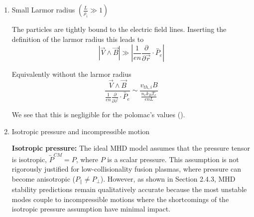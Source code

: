 \begin{enumerate}
We get for Polomac (\cite{Elio2024}):
\begin{itemize}
    \item Mass density: $ \varrho = n m_i = \SI{e20}{\per\meter\cubed} \times \SI{1.67e-27}{\kilo\gram} = \SI{1.67e-7}{\kilo\gram\per\meter\cubed}$
    \item Magnetic field: $B = \SI{0.25}{\tesla}$ (midpoint of \SIrange{0.2}{0.3}{\tesla} operating range)
    \item Alfvén velocity: $v_A = \frac{\SI{0.25}{\tesla}}{\sqrt{4\pi \times \SI{e-7}{\henry\per\meter} \times \SI{1.67e-7}{\kilo\gram\per\meter\cubed}}} = \SI{5.5e4}{\meter\per\second}$
    \item Speed of light: $c = \SI{3e8}{\meter\per\second}$
    \item $\frac{v_A}{c} = \frac{\SI{5.5e4}{\meter\per\second}}{\SI{3e8}{\meter\per\second}} \approx \num{1.8e-4} \ll 1$
\end{itemize}

Since MHD wave velocities are non-relativistic ($v_A \ll c$), we can safely neglect the displacement current $\epsilon_0 \partial \vec{E}/\partial t$ compared to $\vec{J}$ in Ampère's law.

Note that $\mu_0 \vec{J} = \nabla \wedge \vec{B}$ implies $\nabla \cdot \vec{J} = 0$.


\item Small Larmor radius $\left(\frac{L}{\rho_i} \gg 1\right)$

The particles are tightly bound to the electric field lines. Inserting the definition of the larmor radius this leads to
\[
\left|\vec{V} \wedge \vec{B}\right| \gg \left|\frac{1}{en} \frac{\partial}{\partial \vec{r}} \cdot \overleftrightarrow{P_e}\right|
\]

Equivalently without the larmor radius
\[
\frac{\vec{V}\wedge\vec{B}}{\frac{1}{en} \frac{\partial}{\partial \vec{r}} \cdot \overleftrightarrow{P_e}}
\sim \frac{v_{th, i} B}{\frac{n_e k_B T_e}{e n L}}
\]

We see that this is negligible for the polomac's values (\cite{Elio2024}).



\item Isotropic pressure and incompressible motion

    \textbf{Isotropic pressure:} The ideal MHD model assumes that the pressure tensor is isotropic, 
    $\overleftrightarrow{P}^{CM} = P$, where $P$ is a scalar pressure. This assumption 
    is not rigorously justified for low-collisionality fusion plasmas, where pressure can become 
    anisotropic ($P_\parallel \neq P_\perp$). However, as shown in \cite{Freidberg2014} Section 2.4.3, 
    MHD stability predictions remain qualitatively accurate because the most unstable modes couple 
    to incompressible motions where the shortcomings of the isotropic pressure assumption have 
    minimal impact.


\end{enumerate}
